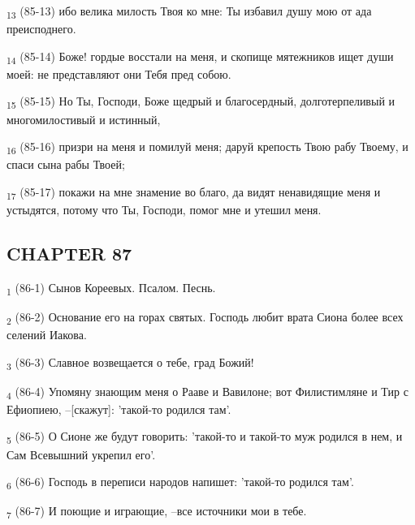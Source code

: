 \begin{tcolorbox}
\textsubscript{13} (85-13) ибо велика милость Твоя ко мне: Ты избавил душу мою от ада преисподнего.
\end{tcolorbox}
\begin{tcolorbox}
\textsubscript{14} (85-14) Боже! гордые восстали на меня, и скопище мятежников ищет души моей: не представляют они Тебя пред собою.
\end{tcolorbox}
\begin{tcolorbox}
\textsubscript{15} (85-15) Но Ты, Господи, Боже щедрый и благосердный, долготерпеливый и многомилостивый и истинный,
\end{tcolorbox}
\begin{tcolorbox}
\textsubscript{16} (85-16) призри на меня и помилуй меня; даруй крепость Твою рабу Твоему, и спаси сына рабы Твоей;
\end{tcolorbox}
\begin{tcolorbox}
\textsubscript{17} (85-17) покажи на мне знамение во благо, да видят ненавидящие меня и устыдятся, потому что Ты, Господи, помог мне и утешил меня.
\end{tcolorbox}
\subsection{CHAPTER 87}
\begin{tcolorbox}
\textsubscript{1} (86-1) Сынов Кореевых. Псалом. Песнь.
\end{tcolorbox}
\begin{tcolorbox}
\textsubscript{2} (86-2) Основание его на горах святых. Господь любит врата Сиона более всех селений Иакова.
\end{tcolorbox}
\begin{tcolorbox}
\textsubscript{3} (86-3) Славное возвещается о тебе, град Божий!
\end{tcolorbox}
\begin{tcolorbox}
\textsubscript{4} (86-4) Упомяну знающим меня о Рааве и Вавилоне; вот Филистимляне и Тир с Ефиопиею, --[скажут]: 'такой-то родился там'.
\end{tcolorbox}
\begin{tcolorbox}
\textsubscript{5} (86-5) О Сионе же будут говорить: 'такой-то и такой-то муж родился в нем, и Сам Всевышний укрепил его'.
\end{tcolorbox}
\begin{tcolorbox}
\textsubscript{6} (86-6) Господь в переписи народов напишет: 'такой-то родился там'.
\end{tcolorbox}
\begin{tcolorbox}
\textsubscript{7} (86-7) И поющие и играющие, --все источники мои в тебе.
\end{tcolorbox}
